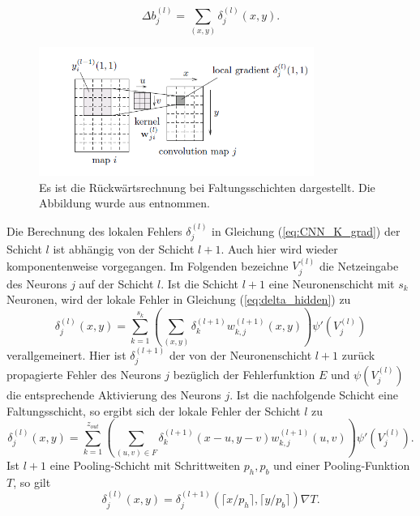 \begin{equation*}
    \Delta b_j^{(l)}= \sum_{(x,y)} \delta_j^{(l)}(x,y).
\end{equation*}

\begin{figure}[h]
    \includegraphics[width=0.8\textwidth]{pics/chapters/CCN/backprop_dudiss.png}
    \centering
    \caption[Rückwärtsrechnung bei CNN]{Es ist die Rückwärtsrechnung bei Faltungsschichten dargestellt. Die Abbildung wurde aus \cite{du_diss} entnommen.}
    \label{abb:error_conv}
\end{figure}
Die Berechnung des lokalen Fehlers $\delta_{j}^{(l)}$ in Gleichung (\ref{eq:CNN_K_grad}) der Schicht $l$ ist abhängig von der Schicht $l+1$. Auch hier wird wieder komponentenweise vorgegangen. Im Folgenden bezeichne $V_j^{(l)}$ die Netzeingabe des Neurons $j$ auf der Schicht $l$.
Ist die Schicht $l+1$ eine Neuronenschicht mit $s_k$ Neuronen, wird der lokale Fehler in Gleichung (\ref{eq:delta_hidden}) zu
\begin{equation*}
    \delta_j^{(l)}(x,y)=\sum_{k=1}^{s_{k}} \left(\sum_{(x,y)} \delta_k^{(l+1)} w_{k,j}^{(l+1)}(x,y)\right) \psi'(V_j^{(l)})
\end{equation*}
verallgemeinert. 
Hier ist $\delta_j^{(l+1)}$ der von der Neuronenschicht $l+1$ zurück propagierte Fehler des Neurons $j$ bezüglich der Fehlerfunktion $E$ und $\psi(V^{(l)}_j)$ die entsprechende Aktivierung des Neurons $j$.
Ist die nachfolgende Schicht eine Faltungsschicht, so ergibt sich der lokale Fehler der Schicht $l$ zu
\begin{equation*}
    \delta_j^{(l)}(x,y)=\sum_{k=1}^{z_{out}} \left(\sum_{(u,v) \in F} \delta_k^{(l+1)}(x-u,y-v) w_{k,j}^{(l+1)}(u,v)\right) \psi'(V_j^{(l)}).
\end{equation*}
Ist $l+1$ eine Pooling-Schicht mit Schrittweiten $p_h,p_b$ und einer Pooling-Funktion $T$, so gilt
\begin{equation}
    \label{eq:upsample1}
    \delta_j^{(l)}(x,y)=\delta_j^{(l+1)}(\lceil x/p_h \rceil ,\lceil y/p_b \rceil)\nabla T.
\end{equation}
